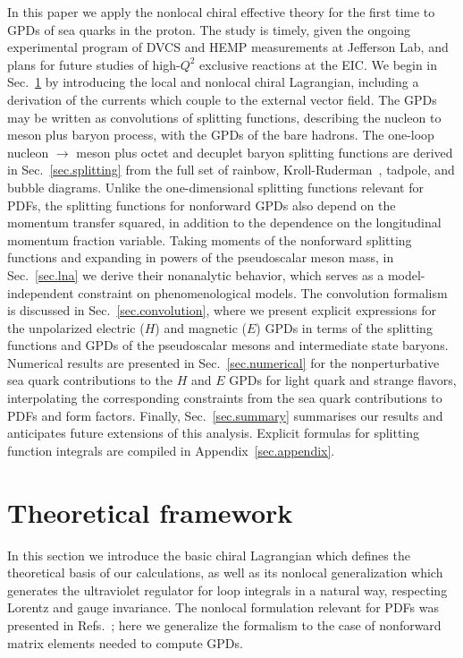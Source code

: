 \documentclass[preprintnumbers,prd,superscriptaddress,preprint]{revtex4-1}
\begin{document}
In this paper we apply the nonlocal chiral effective theory for the first time to GPDs of sea quarks in the proton.
The study is timely, given the ongoing experimental program of DVCS and HEMP measurements at Jefferson Lab, and plans for future studies of high-$Q^2$ exclusive reactions at the EIC. 
%
We begin in Sec.~\ref{sec.framework} by introducing the local and nonlocal chiral Lagrangian, including a derivation of the currents which couple to the external vector field. 
%
The GPDs may be written as convolutions of splitting functions, describing the nucleon to meson plus baryon process, with the GPDs of the bare hadrons.
The one-loop nucleon $\to$ meson plus octet and decuplet baryon splitting functions are derived in Sec.~\ref{sec.splitting} from the full set of  rainbow, Kroll-Ruderman~\cite{Kroll:1953vq}, tadpole, and bubble diagrams.
Unlike the one-dimensional splitting functions relevant for PDFs, the splitting functions for nonforward GPDs also depend on the momentum transfer squared, in addition to the dependence on the longitudinal momentum fraction variable.
%
Taking moments of the nonforward splitting functions and expanding in powers of the pseudoscalar meson mass, in Sec.~\ref{sec.lna} we derive their nonanalytic behavior, which serves as a model-independent constraint on phenomenological models.
The convolution formalism is discussed in Sec.~\ref{sec.convolution}, where we present explicit expressions for the unpolarized electric ($H$) and magnetic ($E$) GPDs in terms of the splitting functions and GPDs of the pseudoscalar mesons and intermediate state baryons.
Numerical results are presented in Sec.~\ref{sec.numerical} for the nonperturbative sea quark contributions to the $H$ and $E$ GPDs for light quark and strange flavors, interpolating the corresponding constraints from the sea quark contributions to PDFs and form factors.
Finally, Sec.~\ref{sec.summary} summarises our results and anticipates future extensions of this analysis.
Explicit formulas for splitting function integrals are compiled in Appendix~\ref{sec.appendix}.


\section{Theoretical framework}
\label{sec.framework}

In this section we introduce the basic chiral Lagrangian which defines the theoretical basis of our calculations, as well as its nonlocal generalization which generates the ultraviolet regulator for loop integrals in a natural way, respecting Lorentz and gauge invariance.
The nonlocal formulation relevant for PDFs was presented in Refs.~\cite{Salamu:2018cny, Salamu:2019dok}; here we generalize the formalism to the case of nonforward matrix elements needed to compute GPDs.
\end{document}
